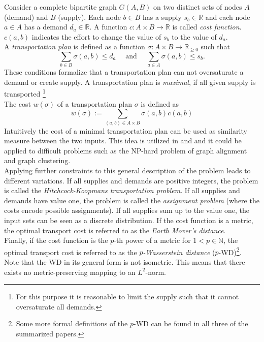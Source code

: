 \documentclass[twoside,twocolumn]{scrartcl}
\begin{document}
Consider a complete bipartite graph $G(A,B)$ on two distinct sets of nodes $A$ (demand) and $B$ (supply). Each node $b\in B$ has a supply $s_b \in\mathbb{R}$ and each node $a\in A$ has a demand $d_a\in \mathbb{R}$. A function $c:A\times B\to \mathbb{R}$ is called \textit{cost function}. $c(a,b)$ indicates the effort to change the value of $s_b$ to the value of $d_a$.\\
A \textit{transportation plan} is defined as a function $\sigma: A\times B\to\mathbb{R}_{\ge 0}$ such that
\[ \sum\limits_{b\in B} \sigma(a, b) \le d_a \quad\text{ and }\quad \sum\limits_{a\in A} \sigma(a, b) \le s_b \text{.}\]
These conditions formalize that a transportation plan can not oversaturate a demand or create supply. A transportation plan is \textit{maximal}, if all given supply is transported \footnote{For this purpose it is reasonable to limit the supply such that it cannot oversaturate all demands.}\\
The cost $w(\sigma)$ of a transportation plan $\sigma$ is defined as 
\[ w(\sigma):=\sum\limits_{(a, b)\in A\times B}\sigma(a,b)c(a,b) \]
Intuitively the cost of a minimal transportation plan can be used as similarity measure between the two inputs. This idea is utilized in \cite{A} and \cite{B} and it could be applied to difficult problems such as the NP-hard problem of graph alignment and graph clustering.\\

Applying further constraints to this general description of the problem leads to different variations. If all supplies and demands are positive integers, the problem is called the \textit{Hitchcock-Koopmans transportation problem}. If all supplies and demands have value one, the problem is called the \textit{assignment problem} (where the costs encode possible assignments). If all supplies sum up to the value one, the input sets can be seen as a discrete distribution. If the cost function is a metric, the optimal transport cost is referred to as the \textit{Earth Mover's distance}.\\
Finally, if the cost function is the $p$-th power of a metric for $1<p\in\mathbb{N}$, the  optimal transport cost is referred to as the $p$\textit{-Wasserstein distance} ($p$-WD)\footnote{Some more formal definitions of the $p$-WD can be found in all three of the 
summarized papers.}.\\
Note that the WD in its general form is not isometric. This means that there exists no metric-preserving mapping to an $L^2$-norm.%
\end{document}
